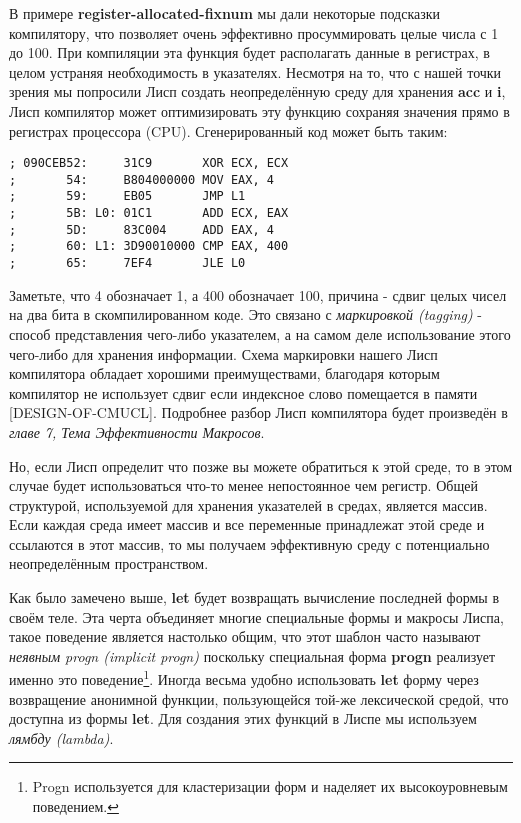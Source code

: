 В примере \textbf{register-allocated-fixnum} мы дали некоторые подсказки компилятору, что позволяет очень эффективно просуммировать целые числа с 1 до 100. При компиляции эта функция будет располагать данные в регистрах, в целом устраняя необходимость в указателях. Несмотря на то, что с нашей точки зрения мы попросили Лисп создать неопределённую среду для хранения \textbf{acc} и \textbf{i}, Лисп компилятор может оптимизировать эту функцию сохраняя значения прямо в регистрах процессора (CPU). Сгенерированный код может быть таким:

\begin{verbatim}
; 090CEB52:     31C9       XOR ECX, ECX
;       54:     B804000000 MOV EAX, 4
;       59:     EB05       JMP L1
;       5B: L0: 01C1       ADD ECX, EAX
;       5D:     83C004     ADD EAX, 4
;       60: L1: 3D90010000 CMP EAX, 400
;       65:     7EF4       JLE L0
\end{verbatim}

Заметьте, что 4 обозначает 1, а 400 обозначает 100, причина - сдвиг целых чисел на два бита в скомпилированном коде. Это связано с \emph{маркировкой (tagging)} - способ представления чего-либо указателем, а на самом деле использование этого чего-либо для хранения информации. Схема маркировки нашего Лисп компилятора обладает хорошими преимуществами, благодаря которым компилятор не использует сдвиг если индексное слово помещается в памяти [DESIGN-OF-CMUCL]. Подробнее разбор Лисп компилятора будет произведён в \emph{главе 7, Тема Эффективности Макросов}.

Но, если Лисп определит что позже вы можете обратиться к этой среде, то в этом случае будет использоваться что-то менее непостоянное чем регистр. Общей структурой, используемой для хранения указателей в средах, является массив. Если каждая среда имеет массив и все переменные принадлежат этой среде и ссылаются в этот массив, то мы получаем эффективную среду с потенциально неопределённым пространством.

Как было замечено выше, \textbf{let} будет возвращать вычисление последней формы в своём теле. Эта черта объединяет многие специальные формы и макросы Лиспа, такое поведение является настолько общим, что этот шаблон часто называют \emph{неявным progn (implicit progn)} поскольку специальная форма \textbf{progn} реализует именно это поведение\footnote{Progn используется для кластеризации форм и наделяет их высокоуровневым поведением.}. Иногда весьма удобно использовать \textbf{let} форму через возвращение анонимной функции, пользующейся той-же лексической средой, что доступна из формы \textbf{let}. Для создания этих функций в Лиспе мы используем \emph{лямбду (lambda)}.


